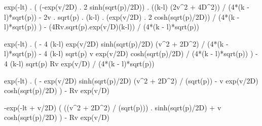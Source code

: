 exp(-lt) . (
    (-exp(v/2D) . 2 sinh(sqrt(p)/2D)) . ((k-l) (2v^2 + 4D^2)) / (4*(k - l)*sqrt(p))
    - 2v . sqrt(p) . (k-l) . (exp(v/2D) . 2 cosh(sqrt(p)/2D)) / (4*(k - l)*sqrt(p))
    ) 
- (4Rv.sqrt(p).exp(v/D)(k-l)) / (4*(k - l)*sqrt(p))

exp(-lt) . (
    - 4 (k-l) exp(v/2D) sinh(sqrt(p)/2D) (v^2 + 2D^2) / (4*(k - l)*sqrt(p))
    - 4 (k-l) sqrt(p) v exp(v/2D) cosh(sqrt(p)/2D) / (4*(k - l)*sqrt(p))
    ) 
- 4 (k-l) sqrt(p) Rv exp(v/D)  / (4*(k - l)*sqrt(p))

exp(-lt) . (
    - exp(v/2D) sinh(sqrt(p)/2D) (v^2 + 2D^2) / (sqrt(p))
    - v exp(v/2D) cosh(sqrt(p)/2D)
    ) 
- Rv exp(v/D)

-exp(-lt + v/2D) (
    ((v^2 + 2D^2) / (sqrt(p))) . sinh(sqrt(p)/2D) 
    + v  cosh(sqrt(p)/2D)
    ) 
- Rv exp(v/D)
